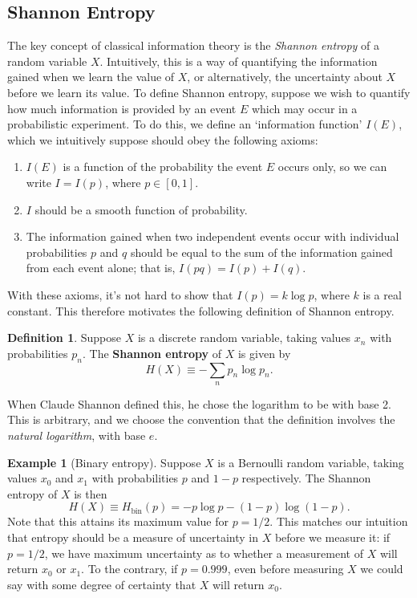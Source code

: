 \documentclass[12pt,a4paper]{report}
\numberwithin{equation}{section}
\theoremstyle{definition}
\newtheorem{definition}{Definition}[section]
\theoremstyle{theorem}
\theoremstyle{theorem}
\theoremstyle{example}
\newtheorem{example}{Example}[section]
\theoremstyle{definition}
\begin{document}
\subsection{Shannon Entropy}
The key concept of classical information theory is the \textit{Shannon entropy} of a random variable $X$. Intuitively, this is a way of quantifying the information gained when we learn the value of $X$, or alternatively, the uncertainty about $X$ before we learn its value. To define Shannon entropy, suppose we wish to quantify how much information is provided by an event $E$ which may occur in a probabilistic experiment. To do this, we define an `information function' $I(E)$, which we intuitively suppose should obey the following axioms:
\begin{enumerate}
	\item $I(E)$ is a function of the probability the event $E$ occurs only, so we can write $I=I(p)$, where $p\in[0,1]$.
	\item $I$ should be a smooth function of probability.
	\item The information gained when two independent events occur with individual probabilities $p$ and $q$ should be equal to the sum of the information gained from each event alone; that is, $I(pq)=I(p)+I(q)$.
\end{enumerate}
With these axioms, it's not hard to show that $I(p)=k\log{p}$, where $k$ is a real constant. This therefore motivates the following definition of Shannon entropy.
\begin{definition}
	Suppose $X$ is a discrete random variable, taking values $x_{n}$ with probabilities $p_{n}$. The \textbf{Shannon entropy} of $X$ is given by
	\begin{equation}
		H(X)\equiv-\sum_{n}p_{n}\log{p_{n}}.
	\end{equation}
\end{definition}
When Claude Shannon defined this, he chose the logarithm to be with base 2. This is arbitrary, and we choose the convention that the definition involves the \textit{natural logarithm}, with base $e$.
\begin{example}[Binary entropy]
	Suppose $X$ is a Bernoulli random variable, taking values $x_{0}$ and $x_{1}$ with probabilities $p$ and $1-p$ respectively. The Shannon entropy of $X$ is then
	\begin{equation}
		H(X)\equiv H_{\text{bin}}(p)=-p\log{p}-(1-p)\log{(1-p)}.
	\end{equation}
	Note that this attains its maximum value for $p=1/2$. This matches our intuition that entropy should be a measure of uncertainty in $X$ before we measure it: if $p=1/2$, we have maximum uncertainty as to whether a measurement of $X$ will return $x_{0}$ or $x_{1}$. To the contrary, if $p=0.999$, even before measuring $X$ we could say with some degree of certainty that $X$ will return $x_{0}$.
\end{example}
\end{document}
